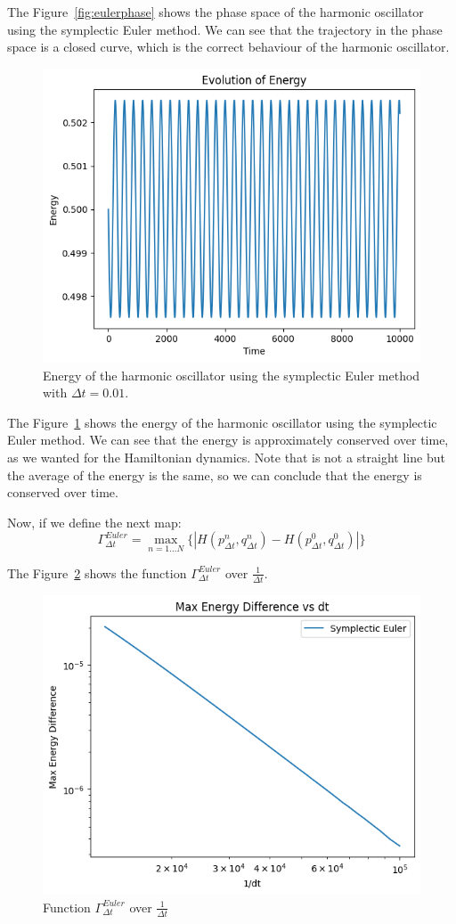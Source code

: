 \documentclass{report}
\begin{document}
The Figure~\ref{fig:eulerphase} shows the phase space of the harmonic oscillator using the symplectic Euler method. We can see that the trajectory in the phase space is a closed curve, which is the correct behaviour of the harmonic oscillator.

\begin{figure}[H]
	\centering
	\includegraphics[width=0.5\linewidth]{./Figures/Sympletic/eulerenergy.png}
	\caption{Energy of the harmonic oscillator using the symplectic Euler method with \(\Delta t = 0.01\).}
	\label{fig:eulerenergy}
\end{figure}

The Figure~\ref{fig:eulerenergy} shows the energy of the harmonic oscillator using the symplectic Euler method. We can see that the energy is approximately conserved over time, as we wanted for the Hamiltonian dynamics. Note that is not a straight line but the average of the energy is the same, so we can conclude that the energy is conserved over time.

Now, if we define the next map:
\[
	\Gamma_{\Delta t}^{Euler} = \max_{n = 1 ... N}\{|H(p^n_{\Delta t}, q^n_{\Delta t}) - H(p^0_{\Delta t}, q^0_{\Delta t})|\}
\]

The Figure~\ref*{fig:eulermaxenergy} shows the function \(\Gamma_{\Delta t}^{Euler}\) over \(\frac{1}{\Delta t}\).

\begin{figure}[H]
	\centering
	\includegraphics[width=0.5\linewidth]{./Figures/Sympletic/eulermaxenergy.png}
	\caption{Function \(\Gamma_{\Delta t}^{Euler}\) over \(\frac{1}{\Delta t}\)}
	\label{fig:eulermaxenergy}
\end{figure}
\end{document}
